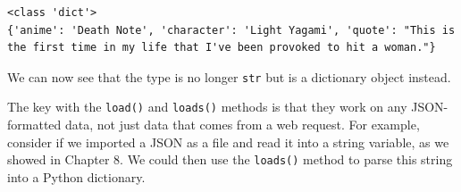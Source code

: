 \begin{lstlisting}[style=none]
<class 'dict'>
{'anime': 'Death Note', 'character': 'Light Yagami', 'quote': "This is the first time in my life that I've been provoked to hit a woman."}
\end{lstlisting}
We can now see that the type is no longer \verb|str| but is a dictionary object instead.\par
The key with the \verb|load()| and \verb|loads()| methods is that they work on any JSON-formatted data, not just data that comes from a web request. For example, consider if we imported a JSON as a file and read it into a string variable, as we showed in Chapter 8. We could then use the \verb|loads()| method to parse this string into a Python dictionary.